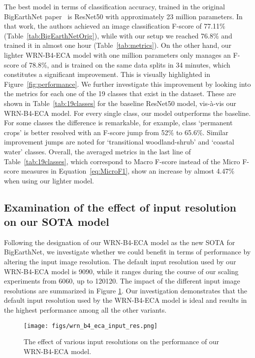 \documentclass[journal]{IEEEtran}
\begin{document}
The best model in terms of classification accuracy, trained in the original BigEarthNet paper~\citep{sumbul2020bigearthnet} is ResNet50 with approximately 23 million parameters. In that work, the authors achieved an image classification F-score of 77.11\% (Table~\ref{tab:BigEarthNetOrig}), while with our setup we reached 76.8\% and trained it in almost one hour (Table~\ref{tab:metrics}). On the other hand, our lighter WRN-B4-ECA model with one million parameters only manages an F-score of 78.8\%, and is trained on the same data splits in 34 minutes, which constitutes a significant improvement. This is visually highlighted in Figure~\ref{fig:performance}. We further investigate this improvement by looking into the metrics for each one of the 19 classes that exist in the dataset. These are shown in Table~\ref{tab:19classes} for the baseline ResNet50 model, vis-à-vis our WRN-B4-ECA model. For every single class, our model outperforms the baseline. For some classes the difference is remarkable, for example, class `permanent crops' is better resolved with an F-score jump from 52\% to 65.6\%. Similar improvement jumps are noted for `transitional woodland-shrub' and `coastal water' classes. Overall, the averaged metrics in the last line of Table~\ref{tab:19classes}, which correspond to Macro F-score instead of the Micro F-score measures in Equation~\ref{eq:MicroF1}, show an increase by almost 4.47\% when using our lighter model.

\subsection{Examination of the effect of input resolution on our SOTA model}
Following the designation of our WRN-B4-ECA model as the new SOTA for BigEarthNet, we investigate whether we could benefit in terms of performance by altering the input image resolution. The default input resolution used by our WRN-B4-ECA model is 9090, while it ranges during the course of our scaling experiments from 6060, up to 120120. The impact of the different input image resolutions are summarized in Figure \ref{fig:wrn_b4_eca_input_res}. Our investigation demonstrates that the default input resolution used by the WRN-B4-ECA model is ideal and results in the highest performance among all the other variants.


\begin{figure}[ht]
\centering
 \texttt{[image: figs/wrn\_b4\_eca\_input\_res.png]}
\caption{The effect of various input resolutions on the performance of our WRN-B4-ECA model.}
\label{fig:wrn_b4_eca_input_res}
\end{figure}
\end{document}
